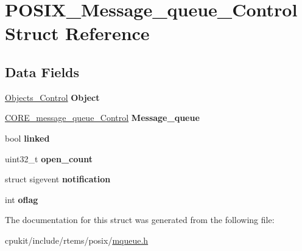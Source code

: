 \hypertarget{structPOSIX__Message__queue__Control}{}\section{P\+O\+S\+I\+X\+\_\+\+Message\+\_\+queue\+\_\+\+Control Struct Reference}
\label{structPOSIX__Message__queue__Control}
\subsection*{Data Fields}
\begin{DoxyCompactItemize}
\item 
\mbox{\label{structPOSIX__Message__queue__Control_a182145c19d1b1cf130320b7ec0c2cf3c}} 
\mbox{\hyperlink{structObjects__Control}{Objects\+\_\+\+Control}} {\bfseries Object}
\item 
\mbox{\label{structPOSIX__Message__queue__Control_a0d377055c88cc4bb48951a3f54c50516}} 
\mbox{\hyperlink{structCORE__message__queue__Control}{C\+O\+R\+E\+\_\+message\+\_\+queue\+\_\+\+Control}} {\bfseries Message\+\_\+queue}
\item 
\mbox{\label{structPOSIX__Message__queue__Control_a9eb5a33e1cad003501ccf64b210d0612}} 
bool {\bfseries linked}
\item 
\mbox{\label{structPOSIX__Message__queue__Control_ad2c7b82d4c69117665dfda6e1eff1a5c}} 
uint32\+\_\+t {\bfseries open\+\_\+count}
\item 
\mbox{\label{structPOSIX__Message__queue__Control_a2d3d764c114aea3bdbc8525206d58663}} 
struct sigevent {\bfseries notification}
\item 
\mbox{\label{structPOSIX__Message__queue__Control_a5774e33a16827406dc62661b61c98834}} 
int {\bfseries oflag}
\end{DoxyCompactItemize}


The documentation for this struct was generated from the following file\+:\begin{DoxyCompactItemize}
\item 
cpukit/include/rtems/posix/\mbox{\hyperlink{rtems_2posix_2mqueue_8h}{mqueue.\+h}}\end{DoxyCompactItemize}
